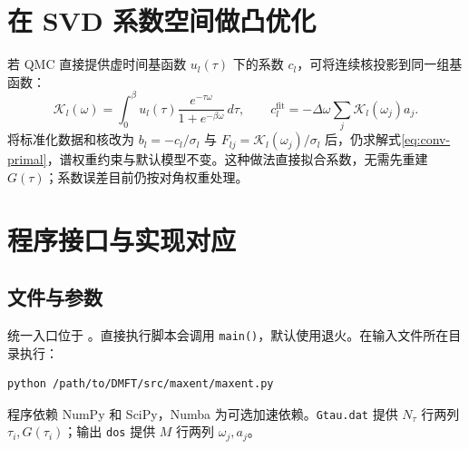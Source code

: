 \documentclass[UTF8,fontset=fandol,11pt]{ctexart}
\begin{document}
\section{在 SVD 系数空间做凸优化}
若 QMC 直接提供虚时间基函数 $u_l(\tau)$ 下的系数 $c_l$，可将连续核投影到同一组基函数：
\begin{equation}
    \mathcal K_l(\omega)=\int_0^\beta u_l(\tau)\frac{e^{-\tau\omega}}{1+e^{-\beta\omega}}\,d\tau,\qquad c_l^{\mathrm{fit}}=-\Delta\omega\sum_j\mathcal K_l(\omega_j)a_j.
\end{equation}
将标准化数据和核改为 $b_l=-c_l/\sigma_l$ 与 $F_{lj}=\mathcal K_l(\omega_j)/\sigma_l$ 后，仍求解式\eqref{eq:conv-primal}，谱权重约束与默认模型不变。这种做法直接拟合系数，无需先重建 $G(\tau)$；系数误差目前仍按对角权重处理。

\section{程序接口与实现对应}
\subsection{文件与参数}
统一入口位于 。直接执行脚本会调用 \texttt{main()}，默认使用退火。在输入文件所在目录执行：
\begin{verbatim}
python /path/to/DMFT/src/maxent/maxent.py
\end{verbatim}
程序依赖 NumPy 和 SciPy，Numba 为可选加速依赖。\texttt{Gtau.dat} 提供 $N_\tau$ 行两列 $\tau_i,G(\tau_i)$；输出 \texttt{dos} 提供 $M$ 行两列 $\omega_j,a_j$。
\end{document}
